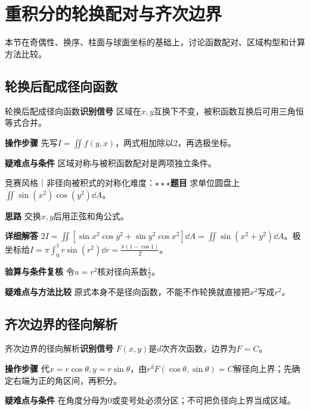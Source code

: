 \section{重积分的轮换配对与齐次边界}\label{ic:delta_multiple}

\begin{examtip}本节在奇偶性、换序、柱面与球面坐标的基础上，讨论函数配对、区域构型和计算方法比较。\end{examtip}

\subsection{轮换后配成径向函数}\label{ic:delta_multiple:permutationpair}\begin{method}{轮换后配成径向函数}\textbf{识别信号} 区域在$x,y$互换下不变，被积函数互换后可用三角恒等式合并。\par \textbf{操作步骤} 先写$I=\iint f(y,x)$，两式相加除以2，再选极坐标。\par \textbf{疑难点与条件} 区域对称与被积函数配对是两项独立条件。\end{method}

\begin{example}{竞赛风格｜非径向被积式的对称化}{难度：$\star\star\star$}\label{ic:ex:delta_multiple:sinepair}\textbf{题目} 求单位圆盘上$\iint\sin(x^2)\cos(y^2)\dd A$。\par \textbf{思路} 交换$x,y$后用正弦和角公式。\par \textbf{详细解答} $2I=\iint[\sin x^2\cos y^2+\sin y^2\cos x^2]\dd A=\iint\sin(x^2+y^2)\dd A$。极坐标给$I=\pi\int_0^1r\sin(r^2)\dd r=\frac{\pi(1-\cos1)}{2}$。\par \textbf{验算与条件复核} 令$u=r^2$核对径向系数$\frac{1}{2}$。\par \textbf{疑难点与方法比较} 原式本身不是径向函数，不能不作轮换就直接把$x^2$写成$r^2$。\end{example}

\subsection{齐次边界的径向解析}\label{ic:delta_multiple:homogeneousboundary}\begin{method}{齐次边界的径向解析}\textbf{识别信号} $F(x,y)$是$d$次齐次函数，边界为$F=C$。\par \textbf{操作步骤} 代$x=r\cos\theta,y=r\sin\theta$，由$r^dF(\cos\theta,\sin\theta)=C$解径向上界；先确定右端为正的角区间，再积分。\par \textbf{疑难点与条件} 在角度分母为0或变号处必须分区；不可把负径向上界当成区域。\end{method}

